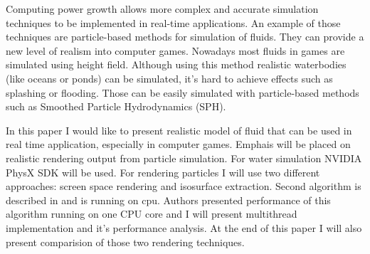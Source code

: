 


\begin{abstracts}        %

Computing power growth allows more complex and accurate simulation techniques to be implemented in 
real-time applications. An example of those techniques are particle-based methods for simulation of fluids. 
They can provide a new level of realism into computer games. Nowadays most fluids in games are simulated using height field. 
Although using this method realistic waterbodies (like oceans or ponds) can be simulated, it's hard to achieve effects such as splashing or flooding.
Those can be easily simulated with particle-based methods such as Smoothed Particle Hydrodynamics (SPH). 

In this paper I would like to present realistic model of fluid that can be used in real time application, especially in computer games. Emphais will be placed on realistic rendering output from particle simulation.
For water simulation NVIDIA PhysX SDK will be used. For rendering particles I will use two different approaches: screen space rendering and isosurface extraction. Second algorithm is described in \cite{RosenbergBirdwell2008} and is running on cpu. Authors presented performance of this algorithm running on one CPU core and I will present multithread implementation and it's performance analysis. At the end of this paper I will also present comparision of those two rendering techniques. 


\end{abstracts}


